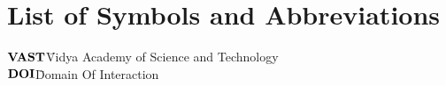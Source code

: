 %
%
%
%
%
%



\chapter*{List of Symbols and Abbreviations}




\begin{tabbing}



\hspace{1cm}\= {$ \bf VAST  $}\quad\= Vidya Academy of Science and Technology\\[5pt]
\hspace{1cm}\= {$ \bf DOI  $}\quad\=Domain Of Interaction\\[5pt]








\end{tabbing}